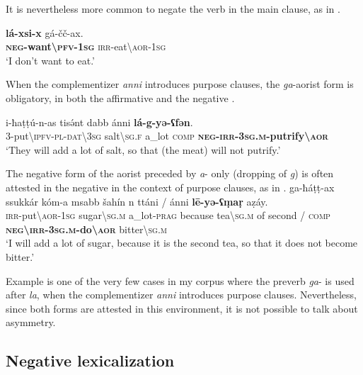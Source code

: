 \documentclass[output=paper,colorlinks,citecolor=brown]{langscibook}
\begin{document}
\noindent It is nevertheless more common to negate the verb in the main clause, as in .


\ea\label{ex:siw:32}
    \gll \textbf{l\'{a}-xsi-x} gá-čč-ax. \\
         \textbf{\textsc{neg}-want{\textbackslash}\textsc{pfv}-\textsc{1sg}} \textsc{irr}{}-eat{\textbackslash}\textsc{aor-1sg}\\
    \glt ‘I don’t want to eat.’
\z

When the complementizer \textit{anni} introduces purpose clauses, the \textit{ga}{}-aorist form is obligatory, in both the affirmative and the negative .

\ea\label{ex:siw:33}
    \gll i-ħaṭṭ\'{u}-n-as tisə́nt dabb ánni \textbf{lá-g-yə-ʕfən}. \\
         3-put{\textbackslash}\textsc{ipfv-pl-dat\textbackslash3sg} salt{\textbackslash}\textsc{sg.f} a\_lot \textsc{comp} \textbf{\textsc{neg-irr-3sg.m}-putrify{\textbackslash}\textsc{aor}} \\
    \glt ‘They will add a lot of salt, so that (the meat) will not putrify.’
\z

The negative form of the aorist preceded by \textit{a}{}- only (dropping of \textit{g}) is often attested in the negative in the context of purpose clauses, as in .
\largerpage
{\ea\label{ex:siw:34}
    \gll ga-ħáṭṭ-ax ssukkár kóm-a msabb šahín n ttáni / ánni \textbf{lē-yə-ʕṃaṛ} aẓáy. \\
         \textsc{irr}{}-put{\textbackslash}\textsc{aor-1sg} sugar{\textbackslash}\textsc{sg.m} a\_lot-\textsc{prag} because tea{\textbackslash}\textsc{sg.m} of second / \textsc{comp} \textbf{\textsc{neg{\textbackslash}irr{}-3sg.m}-do{\textbackslash}\textsc{aor}} bitter{\textbackslash}\textsc{sg.m}\\
    \glt ‘I will add a lot of sugar, because it is the second tea, so that it does not become bitter.’
\z}

Example  is one of the very few cases in my corpus where the preverb \textit{ga}{}- is used after \textit{la}, when the complementizer \textit{anni} introduces purpose clauses. Nevertheless, since both forms are attested in this environment, it is not possible to talk about asymmetry.


\subsection{Negative lexicalization}\label{sec:siw:2.5}
\end{document}
